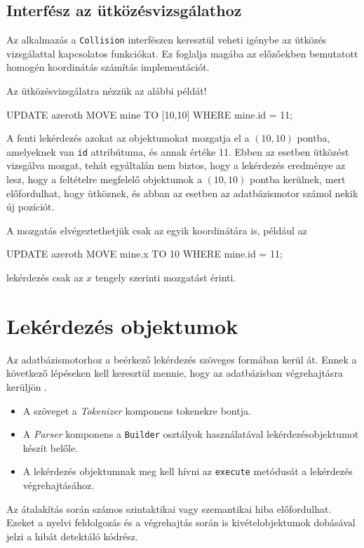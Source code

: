 \subsection{Interfész az ütközésvizsgálathoz}

Az alkalmazás a \texttt{Collision} interfészen keresztül veheti igénybe az ütközés vizsgálattal kapcsolatos funkciókat. Ez foglalja magába az előzőekben bemutatott homogén koordinátás számítás implementációt.

Az ütközésvizsgálatra nézzük az alábbi példát!
\begin{sql}
UPDATE azeroth MOVE mine TO [10,10] WHERE mine.id = 11; 
\end{sql}
A fenti lekérdezés azokat az objektumokat mozgatja el a $(10, 10)$ pontba, amelyeknek van \texttt{id} attribútuma, és annak értéke 11. Ebben az esetben ütközést vizsgálva mozgat, tehát egyáltalán nem biztos, hogy a lekérdezés eredménye az lesz, hogy a feltételre megfelelő objektumok a $(10, 10)$ pontba kerülnek, mert előfordulhat, hogy ütköznek, és abban az esetben az adatbázismotor számol nekik új pozíciót.

A mozgatás elvégeztethetjük csak az egyik koordinátára is, például az
\begin{sql}
UPDATE azeroth MOVE mine.x TO 10 WHERE mine.id = 11;
\end{sql}
lekérdezés csak az $x$ tengely szerinti mozgatást érinti.

\section{Lekérdezés objektumok}

Az adatbázismotorhoz a beérkező lekérdezés szöveges formában kerül át. Ennek a következő lépéseken kell keresztül mennie, hogy az adatbázisban végrehajtásra kerüljön \cite{GD12, AR15}.
\begin{itemize}
\item A szöveget a \textit{Tokenizer} komponens tokenekre bontja.
\item A \textit{Parser} komponens a \texttt{Builder} osztályok használatával lekérdezésobjektumot készít belőle.
\item A lekérdezés objektumnak meg kell hívni az \texttt{execute} metódusát a lekérdezés végrehajtásához.
\end{itemize}

Az átalakítás során számos szintaktikai vagy szemantikai hiba előfordulhat. Ezeket a nyelvi feldolgozás és a végrehajtás során is kivételobjektumok dobásával jelzi a hibát detektáló kódrész.

